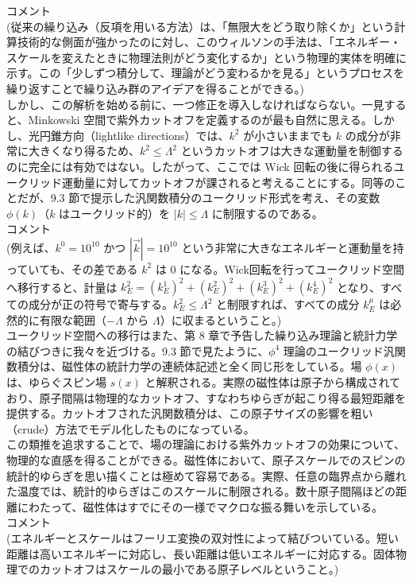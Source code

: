 \documentclass[uplatex,dvipdfmx]{jsarticle}
\begin{document}
コメント\\
(従来の繰り込み（反項を用いる方法）は、「無限大をどう取り除くか」という計算技術的な側面が強かったのに対し、このウィルソンの手法は、「エネルギー・スケールを変えたときに物理法則がどう変化するか」という物理的実体を明確に示す。この「少しずつ積分して、理論がどう変わるかを見る」というプロセスを繰り返すことで繰り込み群のアイデアを得ることができる。)\\
しかし、この解析を始める前に、一つ修正を導入しなければならない。一見すると、Minkowski 空間で紫外カットオフを定義するのが最も自然に思える。しかし、光円錐方向（lightlike directions）では、$k^2$ が小さいままでも $k$ の成分が非常に大きくなり得るため、$k^2 \le \Lambda^2$ というカットオフは大きな運動量を制御するのに完全には有効ではない。したがって、ここでは Wick 回転の後に得られるユークリッド運動量に対してカットオフが課されると考えることにする。同等のことだが、9.3 節で提示した汎関数積分のユークリッド形式を考え、その変数 $\phi(k)$（$k$ はユークリッド的）を $|k| \le \Lambda$ に制限するのである。\\
コメント\\
(例えば、$k^0 = 10^{10}$ かつ $|\vec{k}| = 10^{10}$ という非常に大きなエネルギーと運動量を持っていても、その差である $k^2$ は $0$ になる。Wick回転を行ってユークリッド空間へ移行すると、計量は $k_E^2 = (k_E^1)^2 + (k_E^2)^2 + (k_E^3)^2 + (k_E^4)^2$ となり、すべての成分が正の符号で寄与する。$k_E^2 \le \Lambda^2$ と制限すれば、すべての成分 $k_E^\mu$ は必然的に有限な範囲（$-\Lambda$ から $\Lambda$）に収まるということ。)\\
ユークリッド空間への移行はまた、第 8 章で予告した繰り込み理論と統計力学の結びつきに我々を近づける。9.3 節で見たように、$\phi^4$ 理論のユークリッド汎関数積分は、磁性体の統計力学の連続体記述と全く同じ形をしている。場 $\phi(x)$ は、ゆらぐスピン場 $s(x)$ と解釈される。実際の磁性体は原子から構成されており、原子間隔は物理的なカットオフ、すなわちゆらぎが起こり得る最短距離を提供する。カットオフされた汎関数積分は、この原子サイズの影響を粗い（crude）方法でモデル化したものになっている。\\
この類推を追求することで、場の理論における紫外カットオフの効果について、物理的な直感を得ることができる。磁性体において、原子スケールでのスピンの統計的ゆらぎを思い描くことは極めて容易である。実際、任意の臨界点から離れた温度では、統計的ゆらぎはこのスケールに制限される。数十原子間隔ほどの距離にわたって、磁性体はすでにその一様でマクロな振る舞いを示している。\\
コメント\\
(エネルギーとスケールはフーリエ変換の双対性によって結びついている。短い距離は高いエネルギーに対応し、長い距離は低いエネルギーに対応する。固体物理でのカットオフはスケールの最小である原子レベルということ。)\\
\end{document}
